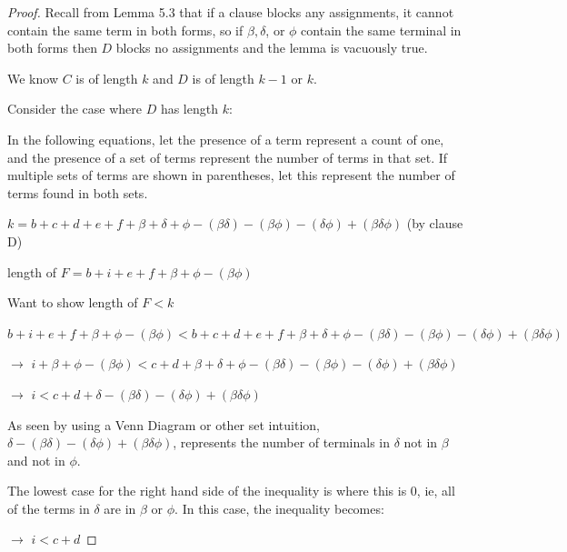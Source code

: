 \documentclass[manuscript]{acmart}
\begin{document}
\begin{proof}
        Recall from Lemma 5.3 that if a clause blocks any assignments, it cannot
        contain the same term in both forms, so if $\beta, \delta$, or $\phi$ contain
        the same terminal in both forms then $D$ blocks no assignments and the lemma 
        is vacuously true.

        We know $C$ is of length $k$ and $D$ is of length $k - 1$ or $k$.

        Consider the case where $D$ has length $k$:

        In the following equations, let the presence of a term represent a count of one,
        and the presence of a set of terms represent the number of terms in that set. If
        multiple sets of terms are shown in parentheses, let this represent the number
        of terms found in both sets.

        $k = b + c + d + e + f + \beta + \delta + \phi - (\beta \delta) - 
        (\beta \phi) - (\delta \phi) + (\beta \delta \phi)$ (by clause D)

        length of $F = b + i + e + f + \beta + \phi - (\beta \phi)$

        Want to show length of $F < k$

        $b + i + e + f + \beta + \phi - (\beta \phi) < 
        b + c + d + e + f + \beta + \delta + \phi - (\beta \delta) - 
        (\beta \phi) - (\delta \phi) + (\beta \delta \phi)$

        $\rightarrow$ $i + \beta + \phi - (\beta \phi) < 
        c + d + \beta + \delta + \phi - (\beta \delta) - 
        (\beta \phi) - (\delta \phi) + (\beta \delta \phi)$

        $\rightarrow$ $i < 
        c + d + \delta - (\beta \delta) - (\delta \phi) + (\beta \delta \phi)$

        As seen by using a Venn Diagram or other set intuition, $\delta - 
        (\beta \delta) - (\delta \phi) + (\beta \delta \phi)$, 
        represents the number of terminals in $\delta$ not in $\beta$
        and not in $\phi$.

        The lowest case for the right hand side of the inequality is where 
        this is 0, ie, all of the terms in $\delta$ are in $\beta$ or 
        $\phi$. In this case, the inequality becomes:

        $\rightarrow$ $i < c + d$



\end{proof}
\end{document}
